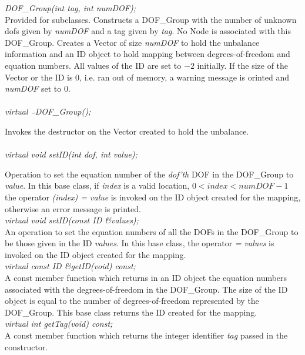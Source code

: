 {\em DOF\_Group(int tag, int numDOF);}  \\
Provided for subclasses. Constructs a  DOF\_Group with the number of
unknown dofs given by {\em numDOF} and a tag given by {\em tag}. No
Node is associated with this DOF\_Group. Creates a Vector of size {\em
numDOF} to hold the unbalance information and an ID object to
hold mapping between degrees-of-freedom and equation numbers. All
values of the ID are set to $-2$ initially. If
the size of the Vector or the ID is $0$, i.e. ran out of memory, a
warning message is orinted and {\em numDOF} set to $0$. \\

  \\
{\em virtual~ $\tilde{}$DOF\_Group();}  

Invokes the destructor on the Vector created to hold the unbalance. \\

  \\
{\em virtual void setID(int dof, int value);} 

Operation to set the equation number of the {\em dof'th} DOF in the
DOF\_Group to {\em value}. In this base class, if {\em index} is a
valid location, $0 < index < numDOF-1$ the operator {\em (index) =
value} is invoked on the ID object created for the mapping, otherwise
an error message is printed. \\ 


{\em virtual void setID(const ID \&values);} \\
An operation to set the equation numbers of all the DOFs in the
DOF\_Group to be those given in the ID {\em values}. In this base
class, the operator {\em = values} is invoked on the ID object created
for the mapping. \\ 

{\em virtual const ID \&getID(void) const;} \\
A const member function which returns in an ID object the equation
numbers associated with the degrees-of-freedom in the DOF\_Group. The
size of the ID object is equal to the number of degrees-of-freedom
represented by the DOF\_Group. This base class returns the ID created
for the mapping.\\ 

{\em virtual int getTag(void) const;} \\
A const member function which returns the integer identifier {\em
tag} passed in the constructor. \\

